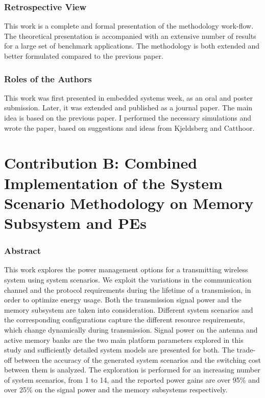 \subsubsection{Retrospective View}

This work is a complete and formal presentation of the methodology work-flow.
The theoretical presentation is accompanied with an extensive number of results for a large set of benchmark applications.
The methodology is both extended and better formulated compared to the previous paper.

\subsubsection{Roles of the Authors}

This work was first presented in embedded systems week, as an oral and poster submission.
Later, it was extended and published as a journal paper.
The main idea is based on the previous paper.
I performed the necessary simulations and wrote the paper, based on suggestions and ideas from Kjeldsberg and Catthoor. 

\section{Contribution B: Combined Implementation of the System Scenario Methodology on Memory Subsystem and PEs}

\subsubsection{Abstract}

This work explores the power management options for a transmitting wireless system using system scenarios. We exploit the variations in the communication channel and the protocol requirements during the lifetime of a transmission, in order to optimize energy usage. Both the transmission signal power and the memory subsystem are taken into consideration. Different system scenarios and the corresponding configurations capture the different resource requirements, which change dynamically during transmission. Signal power on the antenna and active memory banks are the two main platform parameters explored in this study and sufficiently detailed system models are presented for both. The trade-off between the accuracy of the generated system scenarios and the switching cost between them is analyzed. The exploration is performed for an increasing number of system scenarios, from 1 to 14, and the reported power gains are over 95\% and over 25\% on the signal power and the memory subsystems respectively.

